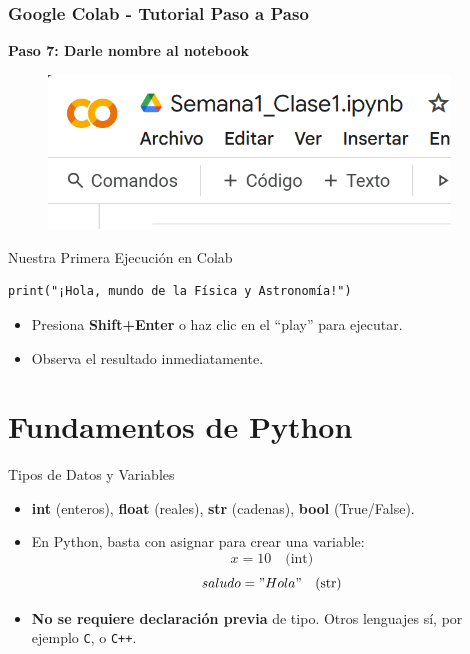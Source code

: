 \documentclass[10pt]{beamer}
\begin{document}
\begin{frame}
  \frametitle{Google Colab - Tutorial Paso a Paso}
  \begin{center}
    \textbf{Paso 7: Darle nombre al notebook}
  \end{center}
  \begin{figure}
    \includegraphics[width=0.95\textwidth]{2) Colab/GColab07.png}
  \end{figure}
\end{frame}


\begin{frame}[fragile]{Nuestra Primera Ejecución en Colab}
\begin{verbatim}
print("¡Hola, mundo de la Física y Astronomía!")
\end{verbatim}
\begin{itemize}
  \item Presiona \textbf{Shift+Enter} o haz clic en el “play” para ejecutar.
  \item Observa el resultado inmediatamente.
\end{itemize}
\end{frame}

\section{Fundamentos de Python}

\begin{frame}{Tipos de Datos y Variables}
  \begin{itemize}
    \item \textbf{int} (enteros), \textbf{float} (reales), \textbf{str} (cadenas), \textbf{bool} (True/False).
    \item En Python, basta con asignar para crear una variable:
          \[
            x = 10 \quad \text{(int)}
          \]
          \[
            saludo = "Hola" \quad \text{(str)}
          \]
    \item \textbf{No se requiere declaración previa} de tipo. Otros lenguajes sí, por ejemplo \texttt{C}, o \texttt{C++}.
  \end{itemize}
\end{frame}
\end{document}
